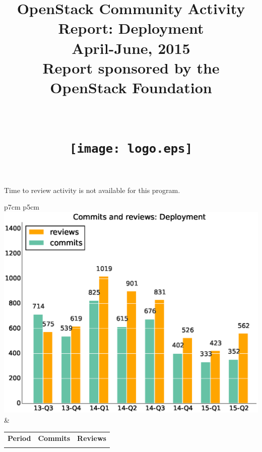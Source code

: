 \documentclass[a4wide,11pt]{article}
\begin{document}
\title{OpenStack Community Activity Report: Deployment\\
      April-June, 2015 \\
      Report sponsored by the OpenStack Foundation\\
        ~~\\~~\\  \texttt{[image: logo.eps]}       \\}




\maketitle

\newpage


Time to review activity is not available for this program.\\



\begin{tabular}{p{7cm} p{5cm}}
    \vspace{0pt} 
    \includegraphics[scale=.35]{figs/commitsDeployment.eps}
    & 
    \vspace{0pt}
    \begin{tabular}{l|r|r|}%
    \bfseries Period & \bfseries Commits & \bfseries Reviews %
    \csvreader[head to column names]{data/commitsDeployment.csv}{}%
    {\\ & \commits & \submitted}
    \end{tabular}
\end{tabular}
\end{document}

